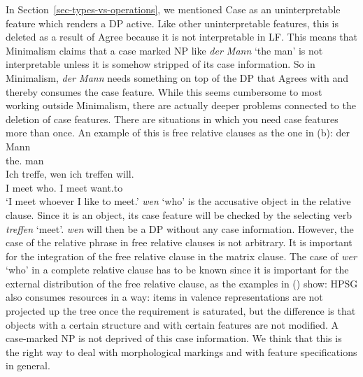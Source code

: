 \documentclass[output=paper
 	        ,biblatex
                ,babelshorthands
                ,newtxmath
                ,draftmode
                ,colorlinks, citecolor=brown
]{langscibook}
\begin{document}
In Section~\ref{sec-types-vs-operations}, we mentioned Case as an uninterpretable feature which
renders a DP active. Like other uninterpretable features, this is deleted as a result of Agree
because it is not interpretable in LF. 
This means that Minimalism claims
that a case marked NP like \emph{der Mann} `the man' is not interpretable unless it is somehow
stripped of its case information.
So in Minimalism, \emph{der Mann} needs something on top of the DP
that Agrees with and thereby consumes the case feature. While this seems cumbersome to most working outside Minimalism,
there are actually deeper problems connected to the deletion of case features. There are
situations in which you need case features more than once. An example of this is free relative
clauses as the one in (b):
\eal
\ex 
\gll der Mann\\
     the.\nom{} man\\
\ex
\gll Ich treffe, wen ich treffen will.\\
     I meet who.\acc{} I meet want.to\\
\glt `I meet whoever I like to meet.'
\zl
\emph{wen} `who' is the accusative object in the relative clause. Since it is an object, its case feature
will be checked by the selecting verb \emph{treffen} `meet'. \emph{wen} will then be a DP without
any case information. However, the case of the relative phrase in free relative clauses is not
arbitrary. It is important for the integration of the free relative clause in the matrix clause. The
case of \emph{wer} `who' in a complete relative clause has to be known since it is important for the
external distribution of the free relative clause, as the examples in () show:
\eal
{}
\zl
HPSG also consumes resources in a way: items in valence representations are not projected up the
tree once the requirement is saturated, but the difference is that objects with a certain structure
and with certain features are not modified. A case-marked NP is not deprived of this case
information. We think that this is the right way to deal with morphological
markings and with feature specifications in general.
\end{document}
